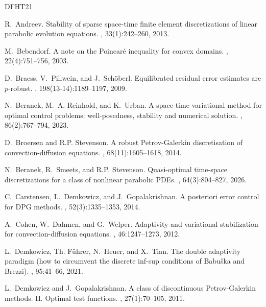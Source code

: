 \documentclass{amsart}
\numberwithin{equation}{section}
\newcommand{\1}{\mathbb 1}
\begin{document}
\begin{thebibliography}{DFHT21}

R.~Andreev.
\newblock Stability of sparse space-time finite element discretizations of
  linear parabolic evolution equations.
, 33(1):242--260, 2013.

M.~Bebendorf.
\newblock A note on the {P}oincar\'e inequality for convex domains.
, 22(4):751--756, 2003.

D.~Braess, V.~Pillwein, and J.~Sch{\"o}berl.
\newblock Equilibrated residual error estimates are {$p$}-robust.
, 198(13-14):1189--1197,
  2009.

N.~Beranek, M.~A. Reinhold, and K.~Urban.
\newblock A space-time variational method for optimal control problems:
  well-posedness, stability and numerical solution.
, 86(2):767--794, 2023.

D.~Broersen and R.P. Stevenson.
\newblock A robust {P}etrov-{G}alerkin discretisation of convection-diffusion
  equations.
, 68(11):1605--1618, 2014.

N.~Beranek, R.~Smeets, and R.P. Stevenson.
\newblock Quasi-optimal time-space discretizations for a class of nonlinear
  parabolic PDEs.
, 64(3):804--827, 2026.

C.~Carstensen, L.~Demkowicz, and J.~Gopalakrishnan.
\newblock A posteriori error control for {DPG} methods.
, 52(3):1335--1353, 2014.

A.~Cohen, W.~Dahmen, and G.~Welper.
\newblock Adaptivity and variational stabilization for convection-diffusion
  equations.
,
  46:1247--1273, 2012.

L.~Demkowicz, Th. F\"{u}hrer, N.~Heuer, and X.~Tian.
\newblock The double adaptivity paradigm (how to circumvent the discrete
  inf-sup conditions of {B}abu\v{s}ka and {B}rezzi).
, 95:41--66, 2021.

L.~Demkowicz and J.~Gopalakrishnan.
\newblock A class of discontinuous {P}etrov-{G}alerkin methods. {II}. {O}ptimal
  test functions.
, 27(1):70--105,
  2011.


\end{thebibliography}
\end{document}
